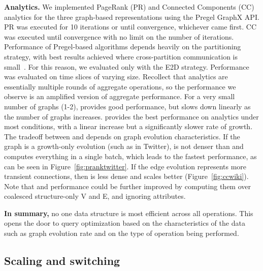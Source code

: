 {\bf Analytics.}  We implemented PageRank (PR) and Connected
Components (CC) analytics for the three graph-based representations
using the Pregel GraphX API.  PR was executed for 10 iterations or
until convergence, whichever came first. CC was executed until
convergence with no limit on the number of iterations.  Performance of
Pregel-based algorithms depends heavily on the partitioning strategy,
with best results achieved where cross-partition communication is
small~\cite{MoffittTempWeb16}.  For this reason, we evaluated only
with the E2D strategy.
%
Performance was evaluated on time slices of varying size.  Recollect
that analytics are essentially multiple rounds of aggregate
operations, so the performance we observe is an amplified version of
aggregate performance.  For a very small number of graphs (1-2), \sg
provides good performance, but slows down linearly as the number of
graphs increases.  \hg provides the best performance on analytics
under most conditions, with a linear increase but a significantly
slower rate of growth.  The tradeoff between \og and \hg depends on
graph evolution characteristics.  If the graph is a growth-only
evolution (such as in Twitter), \og is not denser than \hg and
computes everything in a single batch, which leads to the fastest
performance, as can be seen in Figure~\ref{fig:pranktwitter}.  If the
edge evolution represents more transient connections, then \hg is less
dense and scales better (Figure~\ref{fig:ccwiki}).  Note that \og and
\hg performance could be further improved by computing them over
coalesced structure-only V and E, and ignoring attributes.

{\bf In summary,} no one data structure is most efficient across all
operations.  This opens the door to query optimization based on the
characteristics of the data such as graph evolution rate and on the
type of operation being performed.  


\subsection{Scaling and switching}
\label{sec:exp:scale}

